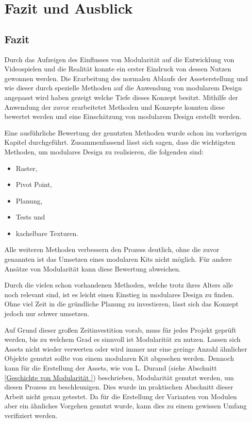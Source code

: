 \chapter{Fazit und Ausblick}
\section{Fazit}
Durch das Aufzeigen des Einflusses von Modularität auf die Entwicklung von Videospielen und die Realität konnte ein erster Eindruck von dessen Nutzen gewonnen werden. Die Erarbeitung des normalen Ablaufs der Asseterstellung und wie dieser durch spezielle Methoden auf die Anwendung von modularem Design angepasst wird haben gezeigt welche Tiefe dieses Konzept besitzt. Mithilfe der Anwendung der zuvor erarbeitetet Methoden und Konzepte konnten diese bewertet werden und eine Einschätzung von modularem Design erstellt werden.
\par
Eine ausführliche Bewertung der genutzten Methoden wurde schon im vorherigen Kapitel durchgeführt. Zusammenfassend lässt sich sagen, dass die wichtigsten Methoden, um modulares Design zu realisieren, die folgenden sind:
\begin{itemize}
\item Raster,
\item Pivot Point,
\item Planung,
\item Tests und
\item kachelbare Texturen.
\end{itemize}
Alle weiteren Methoden verbessern den Prozess deutlich, ohne die zuvor genannten ist das Umsetzen eines modularen Kits nicht möglich. Für andere Ansätze von Modularität kann diese Bewertung abweichen.
\par
Durch die vielen schon vorhandenen Methoden, welche trotz ihres Alters alle noch relevant sind, ist es leicht einen Einstieg in modulares Design zu finden. Ohne viel Zeit in die gründliche Planung zu investieren, lässt sich das Konzept jedoch nur schwer umsetzen.
\par
Auf Grund dieser großen Zeitinvestition vorab, muss für jedes Projekt geprüft werden, bis zu welchem Grad es sinnvoll ist Modularität zu nutzen. Lassen sich Assets nicht wieder verwerten oder wird immer nur eine geringe Anzahl ähnlicher Objekte genutzt sollte von einem modularen Kit abgesehen werden. Dennoch kann für die Erstellung der Assets, wie von L. Durand (siehe Abschnitt \ref{Geschichte von Modularität }) beschrieben, Modularität genutzt werden, um diesen Prozess zu beschleunigen. Dies wurde im praktischen Abschnitt dieser Arbeit nicht genau getestet. Da für die Erstellung der Varianten von Modulen aber ein ähnliches Vorgehen genutzt wurde, kann dies zu einem gewissen Umfang verifiziert werden.
